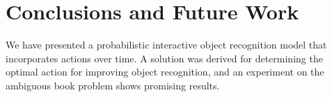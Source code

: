 \section{Conclusions and Future Work}

We have presented a probabilistic interactive object recognition model that incorporates actions over time.  A solution was derived for determining the optimal action for improving object recognition, and an experiment on the ambiguous book problem shows promising results.


   